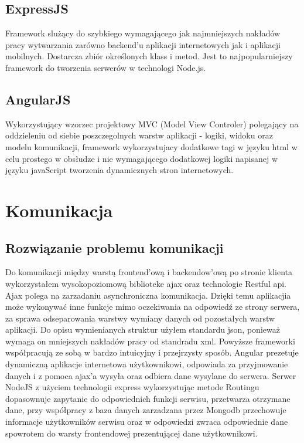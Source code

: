 \documentclass[12pt]{report}
\begin{document}
\subsection{ExpressJS }
Framework slużący do szybkiego wymagającego jak najmniejszych nakładów pracy wytwarzania zarówno backend’u aplikacji internetowych jak i aplikacji mobilnych.
Dostarcza zbiór określonych klass i metod. Jest to najpopularniejszy framework do tworzenia serwerów w technologi Node.js.

\subsection{AngularJS}
Wykorzystujący wzorzec projektowy MVC (Model View Controler) polegający na oddzieleniu od siebie poszczegolnych warstw aplikacji - logiki, widoku oraz modelu komunikacji, framework wykorzystujacy dodatkowe tagi w języku html w celu prostego w obsłudze i nie wymagającego dodatkowej logiki napisanej w języku javaScript tworzenia dynamicznych stron internetowych.

\section{Komunikacja}

\subsection{Rozwiązanie problemu komunikacji}
Do komunikacji między warstą frontend'ową i backendow'ową po stronie klienta wykorzystałem wysokopoziomową biblioteke ajax oraz technologie Restful api. 
Ajax polega na zarzadaniu asynchroniczna komunikacja. 
Dzięki temu aplikacjia może wykonywać inne funkcje mimo oczekiwania na odpowiedź ze strony serwera, za sprawa odseparowania warstwy wymiany danych od pozostałych warstw aplikacji.
Do opisu wymienianych struktur użyłem standardu json, ponieważ wymaga on mniejszych nakładów pracy od standradu xml. 
Powyższe frameworki współpracują ze sobą w bardzo intuicyjny i przejrzysty sposób. 
Angular prezetuje dynamiczną aplikacje internetowa użytkownikowi, odpowiada za przyjmowanie danych i z pomoca ajax'a wysyła oraz odbiera dane wysylane do serwera. 
Serwer NodeJS z użyciem technologii express wykorzystując metode Routingu dopasownuje zapytanie do odpowiednich funkcji serwisu, przetwarza otrzymane dane, przy współpracy z baza danych zarzadzana przez Mongodb przechowuje informacje użytkowników serwisu oraz w odpowiedzi zwraca odpowiednie dane spowrotem do warsty frontendowej prezentującej dane użytkownikowi. 
\end{document}
